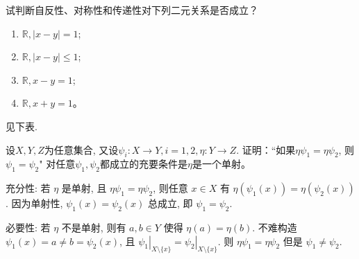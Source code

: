\begin{problem}
    试判断自反性、对称性和传递性对下列二元关系是否成立？
    \begin{enumerate}[label=(\roman*)]
        \item  $\mathbb{ R}, |x - y| = 1 $;
        \item $\mathbb{ R}, |x - y| \leq 1 $;
        \item $\mathbb{ R}, x - y = 1 $;
        \item $\mathbb{ R}, x + y = 1 $。
    \end{enumerate}
\end{problem}

\begin{solution}
    见下表.
    \begin{table}[htbp]
        \caption{问题~}
    \end{table}
\end{solution}

\setcounter{pb}{11}

\begin{problem}
    设$X, Y, Z$为任意集合, 又设$\psi_i:X\to Y,i=1,2,\eta:Y\to Z$. 证明：“如果$\eta\psi_1=\eta\psi_2$, 
    则$\psi_1=\psi_2$" 对任意$\psi_1,\psi_2$都成立的充要条件是$\eta$是一个单射。
\end{problem}

\begin{solution}
    充分性: 若 $\eta$ 是单射, 且 $\eta\psi_{1}=\eta\psi_{2}$, 则任意 $x\in X$ 有 $\eta(\psi_{1}(x))=\eta(\psi_{2}(x))$. 
    因为单射性, $\psi_{1}(x)=\psi_{2}(x)$ 总成立, 即 $\psi_{1}=\psi_{2}$. 
    \par 必要性: 若 $\eta$ 不是单射, 则有 $a,b\in Y$ 使得 $\eta(a)=\eta(b)$. 
    不难构造 $\psi_{1}(x)=a\ne b=\psi_{2}(x)$, 且 $\left.{\psi_{1}}\right|_{X\setminus\{x\}}^{}=\left.{\psi_{2}}\right|_{X\setminus\{x\}}^{}$. 
    则 $\eta\psi_{1}=\eta\psi_{2}$ 但是 $\psi_{1}\ne\psi_{2}$.
\end{solution}


